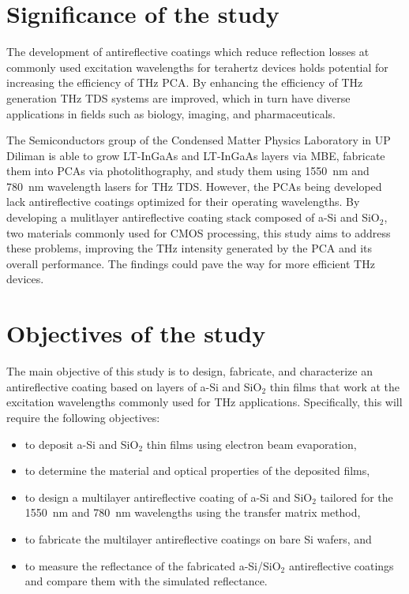 \section{Significance of the study}\label{sec: significance}
The development of antireflective coatings which reduce reflection losses at commonly used excitation wavelengths for terahertz devices holds potential for increasing the efficiency of \gls{THz} \gls{PCA}. By enhancing the efficiency of \gls{THz} generation \gls{THz} \gls{TDS} systems are improved, which in turn have diverse applications in fields such as biology, imaging, and pharmaceuticals.

The Semiconductors group of the Condensed Matter Physics Laboratory in UP Diliman is able to grow \gls{LT}-InGaAs and \gls{LT}-InGaAs layers via \gls{MBE}, fabricate them into \gls{PCA}s via photolithography, and study them using \qty{1550}{\nano\meter} and \qty{780}{\nano\meter} wavelength lasers for \gls{THz} \gls{TDS}. However, the \gls{PCA}s being developed lack antireflective coatings optimized for their operating wavelengths. By developing a mulitlayer antireflective coating stack composed of a-Si and SiO$_2$, two materials commonly used for CMOS processing, this study aims to address these problems, improving the \gls{THz} intensity generated by the \gls{PCA} and its overall performance. The findings could pave the way for more efficient \gls{THz} devices.

\section{Objectives of the study}\label{sec: Objectives}
The main objective of this study is to design, fabricate, and characterize  an antireflective coating based on layers of a-Si and SiO$_2$ thin films  that work at the excitation wavelengths commonly used for \gls{THz} applications. Specifically, this will require the following objectives:
\begin{itemize}
	\item to deposit a-Si and SiO$_2$ thin films using electron beam evaporation,
	\item to determine the material and optical properties of the deposited films,
	\item to design a multilayer antireflective coating of a-Si and SiO$_2$ tailored for the \qty{1550}{\nano\meter} and \qty{780}{\nano\meter} wavelengths using the transfer matrix method,
	\item to fabricate the multilayer antireflective coatings on bare Si wafers, and
	\item to measure the reflectance of the fabricated a-Si/SiO$_2$ antireflective coatings and compare them with the simulated reflectance.
\end{itemize}

